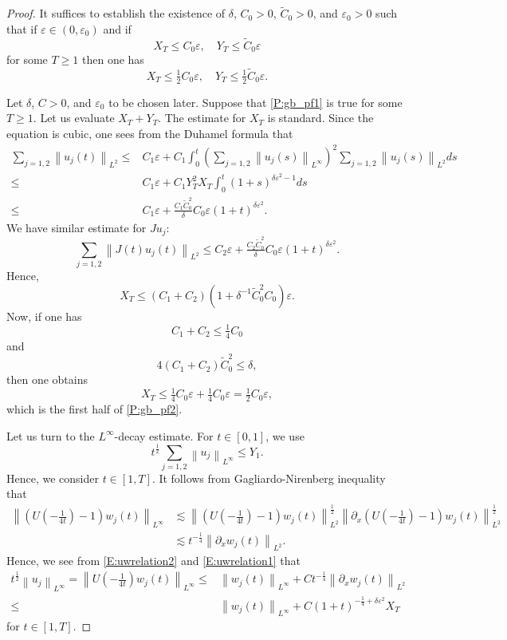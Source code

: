 \documentclass[11pt,a4paper,oneside]{amsart}
\theoremstyle{plain}
\theoremstyle{remark}
\numberwithin{equation}{section}
\newcommand{\norm}[1]{\left\lVert #1\right\rVert}
\def\({\left(}
\def\){\right)}
\def\le{\leqslant}
\def\ge{\geqslant}
\newcommand{\eps}{\varepsilon}
\theoremstyle{definition}
\begin{document}
\begin{proof}
It suffices to establish the existence of $\delta$, $C_0>0$, $\widetilde{C}_0>0$, and $\eps_0>0$ such that
if $\eps \in (0,\eps_0)$ and if
\begin{equation}\label{P:gb_pf1}
	X_T  \le C_0 \eps, \quad
	Y_T \le \widetilde{C}_0 \eps
\end{equation}
for some $T\ge1$ then one has
\begin{equation}\label{P:gb_pf2}
	X_T \le \tfrac12 C_0 \eps, \quad
	Y_T \le \tfrac12 \widetilde{C}_0 \eps.
\end{equation}

Let $\delta$, $C>0$, and $\eps_0$ to be chosen later. Suppose that \eqref{P:gb_pf1}  is true for some $T\ge1$.
Let us evaluate $X_T+Y_T$.
The estimate for $X_T$ is standard.
Since the equation is cubic, one sees from the Duhamel formula that
\begin{align*}
	\sum_{j=1,2} \norm{u_j(t)}_{L^2}
	\le{}& C_1\eps + C_1\int_0^t \(\sum_{j=1,2} \norm{u_j(s)}_{L^\infty}\)^2
	\sum_{j=1,2} \norm{u_j(s)}_{L^2}ds\\
	\le{}& C_1\eps + C_1 Y_T^2 X_T
	\int_0^t (1+s)^{\delta \eps^2 -1} ds\\
	\le{}& C_1\eps + \tfrac{C_1 \widetilde{C}_0^2}{\delta} C_0\eps (1+t)^{\delta \eps^2}.
\end{align*}
We have similar estimate for $Ju_j$:
\[
	\sum_{j=1,2} \norm{J(t) u_j(t)}_{L^2}
\le C_2\eps + \tfrac{C_2 \widetilde{C}_0^2 }{\delta} C_0\eps (1+t)^{\delta \eps^2} .
\]
Hence,
\[
	X_T \le (C_1+C_2)(1 + \delta^{-1} \widetilde{C}_0^2 C_0)\eps.
\]
Now, if one has
\begin{equation}\label{P:gb_pf3}
	C_1+ C_2 \le \tfrac14 C_0
\end{equation}
and 
\begin{equation}\label{P:gb_pf4}
	4(C_1+C_2)\widetilde{C}_0^2 \le  \delta,
\end{equation}
then one obtains
\[
	X_T \le \tfrac14 C_0 \eps + \tfrac14 C_0 \eps  = \tfrac12 C_0 \eps,
\]
which is the first half of \eqref{P:gb_pf2}.

Let us turn to the $L^\infty$-decay estimate. For $t\in[0,1]$, we use
\[
	t^{\frac12}\sum_{j=1,2}\norm{u_j}_{L^\infty} 
\le Y_1.
\]
Hence, we consider $t\in [1,T]$.
It follows from Gagliardo-Nirenberg inequality that
\begin{align*}
	\norm{(U(-\tfrac1{4t})-1) w_j(t)}_{L^\infty} &\lesssim
		\norm{(U(-\tfrac1{4t})-1) w_j(t)}_{L^2}^{\frac12}
		\norm{\partial_x(U(-\tfrac1{4t})-1) w_j(t)}_{L^2}^{\frac12}\\
	&\lesssim t^{-\frac14} \norm{\partial_x w_j(t)}_{L^2}.
\end{align*}
Hence, we see from \eqref{E:uwrelation2} 
and \eqref{E:uwrelation1}
that
\begin{align*}
	t^{\frac12}\norm{u_j}_{L^\infty}=
	\norm{U(-\tfrac1{4t}) w_j(t)}_{L^\infty}
	\le{}& \norm{w_j(t)}_{L^\infty}
	+Ct^{-\frac14} \norm{\partial_x w_j(t)}_{L^2} \\
	\le{}& \norm{w_j(t)}_{L^\infty}
	+C(1+t)^{-\frac14+\delta \eps^2} X_T
\end{align*}
for $t\in[1,T]$.


\end{proof}
\end{document}
